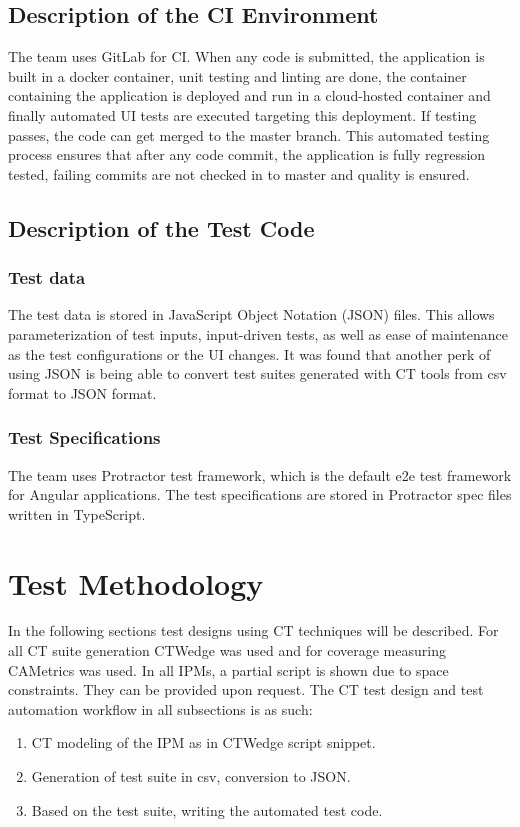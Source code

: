 \documentclass[conference]{IEEEtran}
\begin{document}
	\subsection{Description of the CI Environment }
	
	The team uses GitLab for CI.
	When any code is submitted, the application is built in a docker container, unit testing and linting are done, the container containing the application is deployed and run in a cloud-hosted container and finally automated UI tests are executed targeting this deployment.
	If testing passes, the code can get merged to the master branch. 
	This automated testing process ensures that after any code commit, the application is fully regression tested, failing commits are not checked in to master and quality is ensured. 

\subsection{Description of the Test Code}

	\subsubsection{Test data}
	The test data is stored in JavaScript Object Notation (JSON) files. 
	This allows parameterization of test inputs, input-driven tests, as well as ease of maintenance as the test configurations or the UI changes.
	It was found that another perk of using JSON is being able to convert test suites generated with CT tools from csv format to JSON format.

	\subsubsection{Test Specifications}

	The team uses Protractor test framework, which is the default e2e test framework for Angular applications.
	The test specifications are stored in Protractor spec files written in TypeScript. 

\section{Test Methodology}

	In the following sections test designs using CT techniques will be described. 
	For all CT suite generation CTWedge \cite{gargantini2018migrating} was used and for coverage measuring CAMetrics \cite{leithner2018cametrics} was used.
	In all IPMs, a partial script is shown due to space constraints. They can be provided upon request.
	The CT test design and test automation workflow in all subsections is as such:
	\begin{enumerate}
		\item CT modeling of the IPM as in CTWedge script snippet.
		\item Generation of test suite in csv, conversion to JSON.
		\item Based on the test suite, writing the automated test code.
	\end{enumerate}
	
\end{document}
